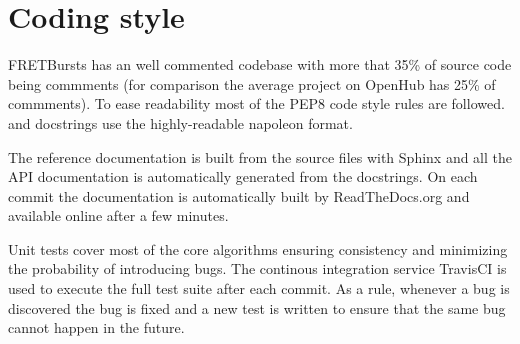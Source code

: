 \section{Coding style}

FRETBursts has an well commented codebase with more that 35\% of source code
being commments (for comparison the average project on OpenHub has 25\%
of commments). To ease readability most of the PEP8 code style rules are followed.
and docstrings use the highly-readable napoleon format.

The reference documentation is built from the source files with Sphinx and
all the API documentation is automatically generated from the docstrings.
On each commit the documentation is automatically built by ReadTheDocs.org
and available online after a few minutes.

Unit tests cover most of the core algorithms ensuring consistency and 
minimizing the probability of introducing bugs. The continous integration
service TravisCI is used to execute the full test suite after each commit.
As a rule, whenever a bug is discovered the bug is fixed and a new test is 
written to ensure that the same bug cannot happen in the future.

